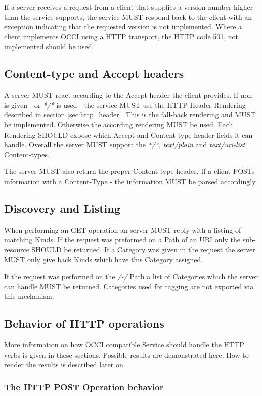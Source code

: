 \documentclass[10pt,a4paper]{article}
\begin{document}
If a server receives a request from a client that supplies a version number higher than the service supports, the service MUST respond back to the client with an exception indicating that the requested version is not implemented. Where a client implements OCCI using a HTTP transport, the HTTP code 501, not implemented should be used. 

\subsection{Content-type and Accept headers}
A server MUST react according to the Accept header the client provides. If non is given - or \textit{*/*} is used - the service MUST use the HTTP Header Rendering described in section \ref{sec:http_header}. This is the fall-back rendering and MUST be implemented. Otherwise the according rendering MUST be used. Each Rendering SHOULD expose which Accept and Content-type header fields it can handle. Overall the server MUST support the \textit{*/*}, \textit{text/plain} and \textit{text/uri-list} Content-types.

The server MUST also return the proper Content-type header. If a client POSTs information with a Content-Type - the information MUST be parsed accordingly.

\subsection{Discovery and Listing}
When performing an GET operation an server MUST reply with a listing of matching Kinds. If the request was preformed on a Path of an URI only the sub-resource SHOULD be returned. If a Category was given in the request the server MUST only give back Kinds which have this Category assigned.

If the request was performed on the \textit{/-/} Path a list of Categories which the server can handle MUST be returned. Categories used for tagging are not exported via this mechanism.

\subsection{Behavior of HTTP operations}

More information on how OCCI compatible Service should handle the HTTP verbs is given in these sections. Possible results are demonstrated here. How to render the results is described later on.

\newpage
\subsubsection{The HTTP POST Operation behavior}
\end{document}
